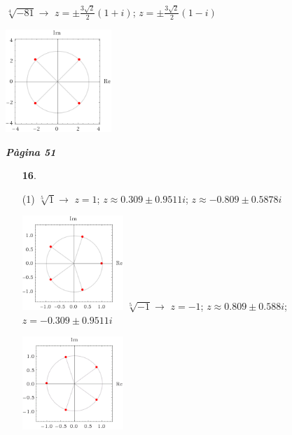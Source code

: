 \documentclass[a4paper, pdf, twoside]{book}
\begin{document}
\begin{multicols}{2}
\begin{enumerate}
\begin{tasks}[column-sep=1em, item-indent=1.3333em]
	 \task* $\sqrt [4]{-81}\rightarrow $ $z=\pm \frac {3\sqrt {2}}{2}(1+i)$; $z=\pm \frac {3\sqrt {2}}{2}(1-i)$\par \includegraphics [width=0.3\textwidth ]{img-sol/t4-15f}
\end{tasks}
 \end{enumerate}
\vspace{0.3cm}


{\textbf{\em Pàgina 51}} \hrulefill
\begin{enumerate}
\vspace{0.25cm}



 \item[\fontfamily{phv}\selectfont\color{blue}\textbf{16}. ] 
 \begin{tasks}[column-sep=1em, item-indent=1.3333em](1)
	 \task* $\sqrt [5]{1} \rightarrow $ $z= 1$; $z \approx 0.309 \pm 0.9511i$; $z\approx -0.809\pm 0.5878 i$ \par \includegraphics [width=0.3\textwidth ]{img-sol/t4-16a}
	 \task* $\sqrt [5]{-1} \rightarrow $ $z=-1 $; $z \approx 0.809\pm 0.588 i$; $z=-0.309 \pm 0.9511 i$ \par \includegraphics [width=0.3\textwidth ]{img-sol/t4-16b}
\end{tasks}
 \end{enumerate}
\begin{enumerate}
\vspace{0.25cm}



\end{enumerate}
\end{multicols}
\end{document}
